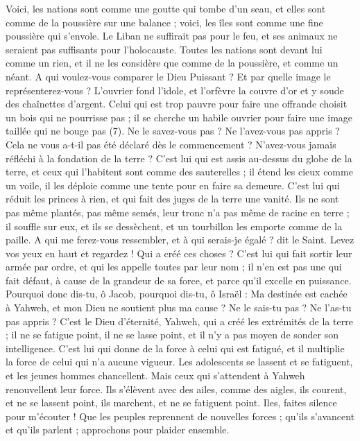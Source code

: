 \begin{multicols}{2}
Voici, les nations sont comme une goutte qui tombe d'un seau, et elles sont comme de la poussière sur une balance ; voici, les îles sont comme une fine poussière qui s’envole.
Le Liban ne suffirait pas pour le feu, et ses animaux ne seraient pas suffisants pour l'holocauste.
Toutes les nations sont devant lui comme un rien, et il ne les considère que comme de la poussière, et comme un néant.
A qui voulez-vous comparer le Dieu Puissant ? Et par quelle image le représenterez-vous ?
L'ouvrier fond l’idole, et l'orfèvre la couvre d’or et y soude des chaînettes d'argent.
Celui qui est trop pauvre pour faire une offrande choisit un bois qui ne pourrisse pas ; il se cherche un habile ouvrier pour faire une image taillée qui ne bouge pas (7).
Ne le savez-vous pas ? Ne l’avez-vous pas appris ? Cela ne vous a-t-il pas été déclaré dès le commencement ? N’avez-vous jamais réfléchi à la fondation de la terre ?
C'est lui qui est assis au-dessus du globe de la terre, et ceux qui l’habitent sont comme des sauterelles ; il étend les cieux comme un voile, il les déploie comme une tente pour en faire sa demeure.
C'est lui qui réduit les princes à rien, et qui fait des juges de la terre une vanité.
Ils ne sont pas même plantés, pas même semés, leur tronc n’a pas même de racine en terre ; il souffle sur eux, et ils se dessèchent, et un tourbillon les emporte comme de la paille.
A qui me ferez-vous ressembler, et à qui serais-je égalé ? dit le Saint.
Levez vos yeux en haut et regardez ! Qui a créé ces choses ? C’est lui qui fait sortir leur armée par ordre, et qui les appelle toutes par leur nom ; il n’en est pas une qui fait défaut, à cause de la grandeur de sa force, et parce qu'il excelle en puissance.
Pourquoi donc dis-tu, ô Jacob, pourquoi dis-tu, ô Israël : Ma destinée est cachée à Yahweh, et mon Dieu ne soutient plus ma cause ?
Ne le sais-tu pas ? Ne l’as-tu pas appris ? C’est le Dieu d'éternité, Yahweh, qui a créé les extrémités de la terre ; il ne se fatigue point, il ne se lasse point, et il n'y a pas moyen de sonder son intelligence.
C'est lui qui donne de la force à celui qui est fatigué, et il multiplie la force de celui qui n'a aucune vigueur.
Les adolescents se lassent et se fatiguent, et les jeunes hommes chancellent.
Mais ceux qui s'attendent à Yahweh renouvellent leur force. Ils s’élèvent avec des ailes, comme des aigles, ils courent, et ne se lassent point, ils marchent, et ne se fatiguent point.
\VerseOne{}Iles, faites silence pour m’écouter ! Que les peuples reprennent de nouvelles forces ; qu'ils s’avancent et qu’ils parlent ; approchons pour plaider ensemble.

\end{multicols}
